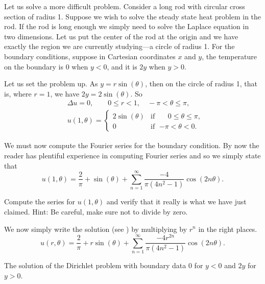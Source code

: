 \begin{example}
Let us solve a more difficult problem.  Consider a long
rod with circular cross section of radius 1.  Suppose we wish to solve the
steady state heat problem in the rod.
If the rod is long enough we simply need to solve
the Laplace equation in two dimensions.  Let us put the center of the rod at
the origin and we have exactly the region we are currently
studying---a circle of radius 1.  For the boundary conditions, suppose in
Cartesian coordinates $x$ and
$y$, the temperature on the boundary is 0 when $y < 0$, and it is $2y$ when $y > 0$.

Let us set the problem up.
As $y = r\sin(\theta)$, then on the
circle of radius 1, that is, where $r=1$, we have $2y = 2\sin(\theta)$.  So
\begin{align*}
& \Delta u = 0 , \qquad 0 \leq r < 1, \quad -\pi < \theta \leq \pi,\\
& u(1,\theta) = 
\begin{cases}
2\sin(\theta) & \text{if } \; \phantom{-}0 \leq \theta \leq \pi, \\
0 & \text{if } \; {-\pi} < \theta < 0.
\end{cases}
\end{align*}

We must now compute the Fourier series for the boundary
condition.  By now the reader has plentiful experience in computing
Fourier series and so we simply state that 
\begin{equation*}
u(1,\theta) = 
\frac{2}{\pi}
+
\sin(\theta)
+
\sum_{n=1}^\infty \frac{-4}{\pi(4n^2-1)} \cos(2n\theta) .
\end{equation*}

\begin{exercise}
Compute the series for $u(1,\theta)$ and verify that it really is what
we have just claimed.  Hint: Be careful, make sure not to divide by zero.
\end{exercise}

We now simply write the solution (see ) by multiplying by $r^n$ in the right places.
\begin{equation*}
u(r,\theta) = 
\frac{2}{\pi}
+
r\sin(\theta)
+
\sum_{n=1}^\infty \frac{-4r^{2n}}{\pi(4n^2-1)} \cos(2n\theta) .
\end{equation*}
\begin{myfig}
\capstart
{}
\caption{The solution of the Dirichlet problem with
boundary data 0 for $y < 0$ and $2y$ for $y > 0$.\label{dirichdisc:zero2yfig}}
\end{myfig}
\end{example}

